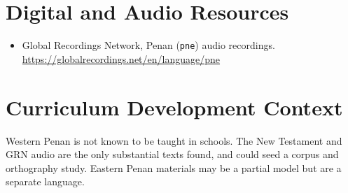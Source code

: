 \documentclass[12pt]{article}
\begin{document}
\section{Digital and Audio Resources}
\begin{itemize}
\item Global Recordings Network, Penan (\texttt{pne}) audio recordings. \url{https://globalrecordings.net/en/language/pne}
\end{itemize}

\section{Curriculum Development Context}
Western Penan is not known to be taught in schools. The New Testament and GRN audio are the only substantial texts found, and could seed a corpus and orthography study. Eastern Penan materials may be a partial model but are a separate language.
\end{document}
